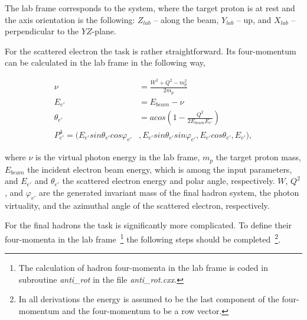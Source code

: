 The lab frame corresponds to the system, where the target proton is at rest and the axis orientation is the following: $Z_{lab}$ -- along the beam, $Y_{lab}$ -- up, and $X_{lab}$ -- perpendicular to the $YZ$-plane.


For the scattered electron the task is rather straightforward. Its four-momentum can be calculated in the lab frame in the following way,

\begin{equation}
\begin{split}
  \nu &= \frac{W^2+Q^2-m_{p}^{2}}{2m_{p}}\\
  E_{e'} &= E_{beam}-\nu\\
 \theta_{e'} &= acos\left (1-\frac{Q^2}{2E_{beam}E_{e'}}\right )\\
P_{e'}^{4} = (E_{e'}sin \theta_{e'}cos \varphi_{e'}&,E_{e'}sin \theta_{e'}sin \varphi_{e'},E_{e'}cos \theta_{e'},E_{e'}),
\end{split}
\end{equation}\label{eq:el_in_lab}

where $\nu$ is the virtual photon energy in the lab frame, $m_{p}$ the target proton mass, $E_{beam}$ the incident electron beam energy,  which is among the input parameters, and $E_{e'}$ and $\theta_{e'}$ the scattered electron energy and polar angle, respectively. $W$, $Q^2$, and $\varphi_{e'}$ are the generated invariant mass of the final hadron system, the photon virtuality, and the azimuthal angle of the scattered electron, respectively.


For the final hadrons the task is significantly more complicated. To define their four-momenta in the lab frame~\footnote[2]{The calculation of hadron four-momenta in the lab frame is coded in subroutine {\em anti\_rot} in the file {\em anti\_rot.cxx}.} the following steps should be completed~\footnote[3]{In all derivations the energy is assumed to be the last component of the four-momentum and the four-momentum to be a row vector.}.

